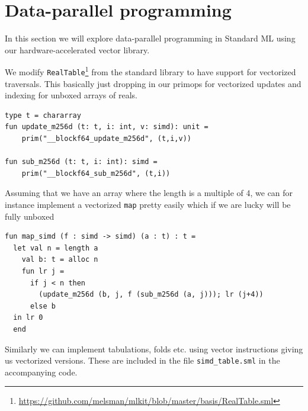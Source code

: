 \documentclass{article}
\begin{document}
\section{Data-parallel programming}

In this section we will explore data-parallel programming in Standard ML using our hardware-accelerated vector library.

We modify \texttt{RealTable}\footnote{\url{https://github.com/melsman/mlkit/blob/master/basis/RealTable.sml}} from the standard library to have support for vectorized traversals. This basically just dropping in our primops for vectorized updates and indexing for unboxed arrays of reals.
\begin{verbatim}
type t = chararray
fun update_m256d (t: t, i: int, v: simd): unit =
    prim("__blockf64_update_m256d", (t,i,v))

fun sub_m256d (t: t, i: int): simd =
    prim("__blockf64_sub_m256d", (t,i))
\end{verbatim}
Assuming that we have an array where the length is a multiple of 4, we can for instance implement a vectorized \texttt{map} pretty easily which if we are lucky will be fully unboxed
\begin{verbatim}
fun map_simd (f : simd -> simd) (a : t) : t =
  let val n = length a
    val b: t = alloc n
	fun lr j =
      if j < n then
        (update_m256d (b, j, f (sub_m256d (a, j))); lr (j+4))
      else b
  in lr 0
  end
\end{verbatim}
Similarly we can implement tabulations, folds etc. using vector instructions giving us vectorized versions. These are included in the file \verb!simd_table.sml! in the accompanying code.
\end{document}
